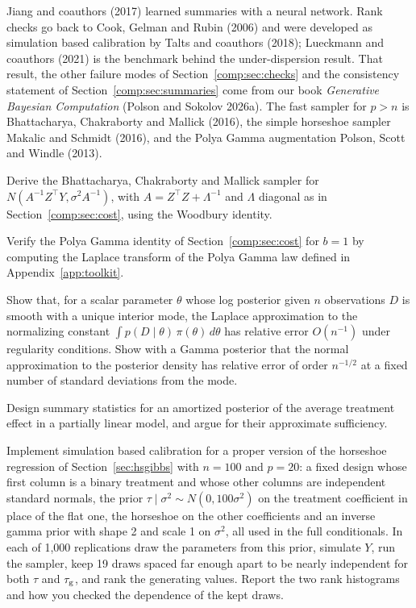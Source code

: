 Jiang and coauthors (2017) learned summaries with a neural network. Rank checks go back to Cook, Gelman and Rubin (2006) and were developed as simulation based calibration by Talts and coauthors (2018); Lueckmann and coauthors (2021) is the benchmark behind the under-dispersion result. That result, the other failure modes of Section~\ref{comp:sec:checks} and the consistency statement of Section~\ref{comp:sec:summaries} come from our book \emph{Generative Bayesian Computation} (Polson and Sokolov 2026a). The fast sampler for $p > n$ is Bhattacharya, Chakraborty and Mallick (2016), the simple horseshoe sampler Makalic and Schmidt (2016), and the Polya Gamma augmentation Polson, Scott and Windle (2013).

\begin{exercises}
\item\label{ex:ch14:1} Derive the Bhattacharya, Chakraborty and Mallick sampler for $N(A^{-1}Z^\top Y, \sigma^2 A^{-1})$, with $A = Z^\top Z + \Lambda^{-1}$ and $\Lambda$ diagonal as in Section~\ref{comp:sec:cost}, using the Woodbury identity.
\item\label{ex:ch14:2} Verify the Polya Gamma identity of Section~\ref{comp:sec:cost} for $b = 1$ by computing the Laplace transform of the Polya Gamma law defined in Appendix~\ref{app:toolkit}.
\item\label{ex:ch14:3} Show that, for a scalar parameter $\theta$ whose log posterior given $n$ observations $D$ is smooth with a unique interior mode, the Laplace approximation to the normalizing constant $\int p(D \mid \theta)\,\pi(\theta)\,d\theta$ has relative error $O(n^{-1})$ under regularity conditions. Show with a Gamma posterior that the normal approximation to the posterior density has relative error of order $n^{-1/2}$ at a fixed number of standard deviations from the mode.
\item\label{ex:ch14:4} Design summary statistics for an amortized posterior of the average treatment effect in a partially linear model, and argue for their approximate sufficiency.
\item\label{ex:ch14:5} Implement simulation based calibration for a proper version of the horseshoe regression of Section~\ref{sec:hsgibbs} with $n = 100$ and $p = 20$: a fixed design whose first column is a binary treatment and whose other columns are independent standard normals, the prior $\tau \mid \sigma^2 \sim N(0, 100\sigma^2)$ on the treatment coefficient in place of the flat one, the horseshoe on the other coefficients and an inverse gamma prior with shape 2 and scale 1 on $\sigma^2$, all used in the full conditionals. In each of 1,000 replications draw the parameters from this prior, simulate $Y$, run the sampler, keep 19 draws spaced far enough apart to be nearly independent for both $\tau$ and $\tau_{\mathrm{g}}$, and rank the generating values. Report the two rank histograms and how you checked the dependence of the kept draws.

\end{exercises}
